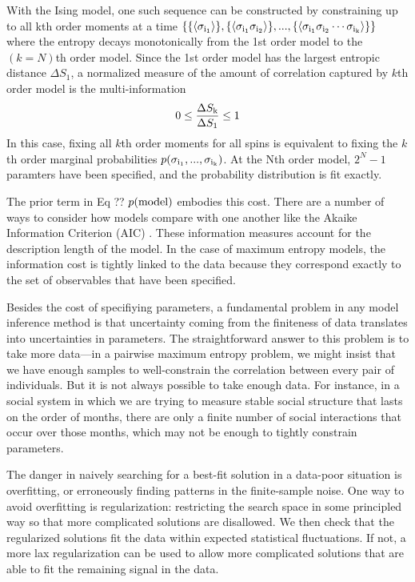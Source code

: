 \documentclass[aps,prl,twocolumn]{revtex4-1}
\begin{document}
With the Ising model, one such sequence can be constructed by constraining up to all kth order moments at a time $\left\{ \{\left<\sigma_{\rm i_1}\right>\},\{\left<\sigma_{\rm i_1}\sigma_{\rm i_2}\right>\},...,\{\left<\sigma_{\rm i_1}\sigma_{\rm i_2}\cdots\sigma_{\rm i_k}\right>\}\right\}$ where the entropy decays monotonically from the 1st order model to the $(k=N)$th order model. Since the 1st order model has the largest entropic distance $\Delta S_1$, a normalized measure of the amount of correlation captured by $k$th order model is the multi-information
\begin{align}
	0\leq \frac{\Delta S_{\rm k}}{\Delta S_{\rm 1}} \leq 1
\end{align}
In this case, fixing all $k$th order moments for all spins is equivalent to fixing the $k$th order marginal probabilities $p(\sigma_{\rm i_1},...,\sigma_{\rm i_k})$. At the Nth order model, $2^N-1$ paramters have been specified, and the probability distribution is fit exactly.

The prior term in Eq ?? $p({\rm model})$ embodies this cost.
There are a number of ways to consider how models compare with one another like the Akaike Information Criterion (AIC) \cite{Lee:2015ev}.
These information measures account for the description length of the model. In the case of maximum entropy models, the information cost is tightly linked to the data because they correspond exactly to the set of observables that have been specified.


Besides the cost of specifiying parameters,
a fundamental problem in any model inference method is that uncertainty coming
from the finiteness of data translates into uncertainties in parameters.
The straightforward answer to this problem is to take more data---in a pairwise
maximum entropy problem, we might insist that we have enough samples to well-constrain
the correlation between every pair of individuals.  But it is not always possible
to take enough data.  For instance, in a social system in which we are trying to
measure stable social structure that lasts on the order of months, there are only
a finite number of social interactions that occur over those months, which may
not be enough to tightly constrain parameters.

The danger in naively searching for a best-fit solution in a data-poor situation
is overfitting, or erroneously finding patterns in the finite-sample noise.
One way to avoid overfitting is regularization:
restricting the search space in some principled way so that more complicated
solutions are disallowed.  We then check that the regularized solutions fit the
data within expected statistical fluctuations.  If not, a more lax regularization
can be used to allow more complicated solutions that are able to fit the
remaining signal in the data.
\end{document}
